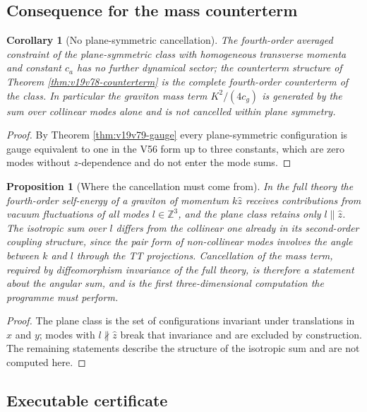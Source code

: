 \documentclass[11pt]{article}
\newtheorem{proposition}[theorem]{Proposition}
\newtheorem{corollary}[theorem]{Corollary}
\theoremstyle{remark}
\begin{document}
\subsection{Consequence for the mass counterterm}

\begin{corollary}[No plane-symmetric cancellation]
\label{cor:v19v79-no-cancel}
The fourth-order averaged constraint of the plane-symmetric class with
homogeneous transverse momenta and constant \(c_a\) has no further
dynamical sector; the counterterm structure of Theorem
\ref{thm:v19v78-counterterm} is the complete fourth-order counterterm
of the class.  In particular the graviton mass term \(K^2/(4c_g)\) is
generated by the sum over collinear modes alone and is not cancelled
within plane symmetry.
\end{corollary}

\begin{proof}
By Theorem \ref{thm:v19v79-gauge} every plane-symmetric configuration
is gauge equivalent to one in the V56 form up to three constants,
which are zero modes without \(z\)-dependence and do not enter the
mode sums.
\end{proof}

\begin{proposition}[Where the cancellation must come from]
\label{prop:v19v79-where}
In the full theory the fourth-order self-energy of a graviton of
momentum \(k\hat z\) receives contributions from vacuum fluctuations of
all modes \(l\in\mathbb Z^3\), and the plane class retains only
\(l\parallel\hat z\).  The isotropic sum over \(l\) differs from the
collinear one already in its second-order coupling structure, since
the pair form of non-collinear modes involves the angle between
\(k\) and \(l\) through the TT projections.  Cancellation of the mass
term, required by diffeomorphism invariance of the full theory, is
therefore a statement about the angular sum, and is the first
three-dimensional computation the programme must perform.
\end{proposition}

\begin{proof}
The plane class is the set of configurations invariant under
translations in \(x\) and \(y\); modes with \(l\not\parallel\hat z\) break
that invariance and are excluded by construction.  The remaining
statements describe the structure of the isotropic sum and are not
computed here.
\end{proof}

\subsection{Executable certificate}
\end{document}
